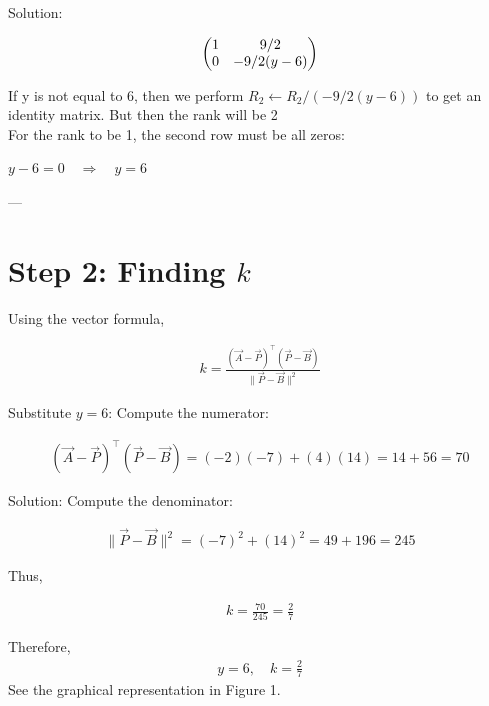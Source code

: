 \documentclass{beamer}
\begin{document}
\begin{frame}{Solution: }

\begin{align}
\begin{pmatrix}1 & 9/2 \\ 0 & -9/2(y-6)\end{pmatrix}
\end{align}

If y is not equal to 6, then we perform $R_2 \leftarrow R_2/(-9/2(y-6))$ to get an identity matrix. But then the rank will be 2 \\
For the rank to be 1, the second row must be all zeros:

$
y - 6 = 0 \quad \Rightarrow \quad y = 6
$

---

\section*{Step 2: Finding \(k\)}

Using the vector formula,

\begin{align}
k = \frac{(\vec{A} - \vec{P})^\top(\vec{P} - \vec{B})}{\|\vec{P} - \vec{B}\|^2}
\end{align}

Substitute $y = 6$:
Compute the numerator:

\begin{align}
(\vec{A}-\vec{P})^\top (\vec{P}-\vec{B}) = (-2)(-7) + (4)(14) = 14 + 56 = 70
\end{align}

\end{frame}

\begin{frame}{Solution:}
Compute the denominator:

\begin{align}
\|\vec{P}-\vec{B}\|^2 = (-7)^2 + (14)^2 = 49 + 196 = 245
\end{align}

Thus,

\begin{align}
k = \frac{70}{245} = \frac{2}{7}
\end{align}

Therefore,
\begin{align}
\boxed{y = 6, \quad k = \frac{2}{7}}
\end{align}  
See the graphical representation in Figure 1.
\end{frame}
\end{document}
